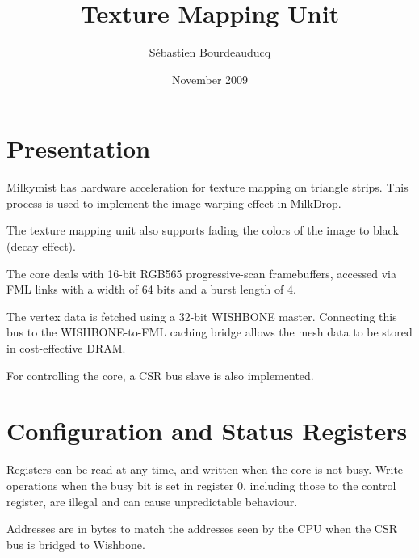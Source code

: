 \documentclass[a4paper,11pt]{article}
\title{Texture Mapping Unit}
\author{S\'ebastien Bourdeauducq}
\date{November 2009}
\begin{document}
\setlength{\parindent}{0pt}
\setlength{\parskip}{5pt}
\maketitle{}

\section{Presentation}
Milkymist has hardware acceleration for texture mapping on triangle strips. This process is used to implement the image warping effect in MilkDrop.

The texture mapping unit also supports fading the colors of the image to black (decay effect).

The core deals with 16-bit RGB565 progressive-scan framebuffers, accessed via FML links with a width of 64 bits and a burst length of 4.

The vertex data is fetched using a 32-bit WISHBONE master. Connecting this bus to the WISHBONE-to-FML caching bridge allows the mesh data to be stored in cost-effective DRAM.

For controlling the core, a CSR bus slave is also implemented.

\section{Configuration and Status Registers}
Registers can be read at any time, and written when the core is not busy. Write operations when the busy bit is set in register 0, including those to the control register, are illegal and can cause unpredictable behaviour.

Addresses are in bytes to match the addresses seen by the CPU when the CSR bus is bridged to Wishbone.
\end{document}
